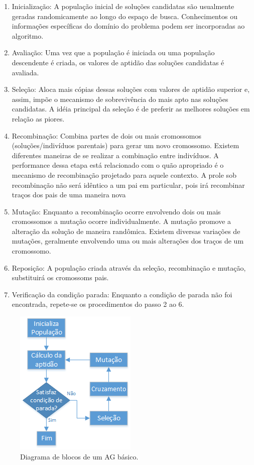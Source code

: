 \documentclass[twoside]{article}
\begin{document}
\begin{multicols}{2}
\begin{enumerate}
\setlength{\itemsep}{0.2cm}%
 \setlength{\parskip}{0.2cm}
\item Inicialização: A população inicial de soluções candidatas são usualmente geradas randomicamente ao longo do espaço de busca. Conhecimentos ou informações específicas do domínio do problema podem ser incorporadas ao algoritmo.
\item Avaliação: Uma vez que a população é iniciada ou uma população descendente é criada, os valores de aptidão das soluções candidatas é avaliada.
\item Seleção: Aloca mais cópias dessas soluções com valores de aptidão superior e, assim, impõe o mecanismo de sobrevivência do mais apto nas soluções candidatas. A idéia principal da seleção é de preferir as melhores soluções em relação as piores.
\item Recombinação: Combina partes de dois ou mais cromossomos (soluções/indivíduos parentais) para gerar um novo cromossomo. Existem diferentes maneiras de se realizar a combinação entre indivíduos. A performance dessa etapa está relacionado com o quão apropriado é o mecanismo de recombinação projetado para aquele contexto. A prole sob recombinação não será idêntico a um pai em particular, pois irá recombinar traços dos pais de uma maneira nova
\item Mutação: Enquanto a recombinação ocorre envolvendo dois ou mais cromossomos a mutação ocorre individualmente. A mutação promove a alteração da solução de maneira randômica. Existem diversas variações de mutações, geralmente envolvendo uma ou mais alterações dos traços de um cromossomo.
\item Reposição: A população criada através da seleção, recombinação e mutação, substituirá os cromossoms pais. 
\item Verificação da condição parada: Enquanto a condição de parada não foi encontrada, repete-se os procedimentos do passo 2 ao 6.
\end{enumerate}

\begin{figure}[H]
  \caption{Diagrama de blocos de um AG básico.}
  \centering
    \includegraphics[scale = 1]{basicga_diagram.png}
\end{figure}


\end{multicols}
\end{document}
